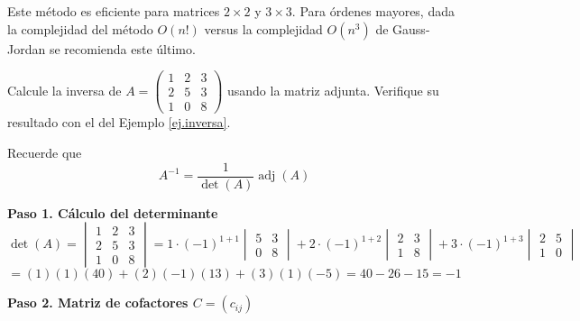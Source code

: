 \begin{rem}
Este método es eficiente para matrices \( 2\times 2 \) y \( 3\times 3 \). Para órdenes mayores, dada la complejidad del método \( O(n!) \) versus la complejidad \( O(n^3) \) de Gauss-Jordan se recomienda este último.
\end{rem}

\begin{example}
Calcule la inversa de \( A = \begin{pmatrix} 1 & 2 & 3 \\ 2 & 5 & 3 \\ 1 & 0 & 8 \end{pmatrix} \) usando la matriz adjunta. Verifique su resultado con el del Ejemplo \ref{ej.inversa}.


\begin{myproof}
Recuerde que \[
A^{-1} = \frac{1}{\det(A)} \operatorname{adj}(A)
\]

\textbf{Paso 1. Cálculo del determinante}
\[
\det(A) = \begin{vmatrix} 1 & 2 & 3 \\ 2 & 5 & 3 \\ 1 & 0 & 8 \end{vmatrix} 
= 1\cdot(-1)^{1+1}\begin{vmatrix} 5 & 3 \\ 0 & 8 \end{vmatrix} 
+ 2\cdot(-1)^{1+2}\begin{vmatrix} 2 & 3 \\ 1 & 8 \end{vmatrix} 
+ 3\cdot(-1)^{1+3}\begin{vmatrix} 2 & 5 \\ 1 & 0 \end{vmatrix}
\]
\[
= (1)(1)(40) + (2)(-1)(13) + (3)(1)(-5) = 40 - 26 - 15 = \boxed{-1}
\]

\textbf{Paso 2. Matriz de cofactores \( C = (c_{ij}) \)}


\end{myproof}
\end{example}
